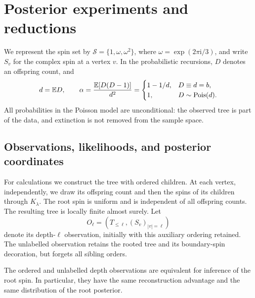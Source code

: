 \section{Posterior experiments and reductions}
\label{fnd:section}

We represent the spin set by
\(\mathcal S=\{1,\omega,\omega^2\}\), where
\(\omega=\exp(2\pi\mathrm{i}/3)\), and write \(S_v\) for the
complex spin at a vertex \(v\). In the probabilistic recursions,
\(D\) denotes an offspring count, and
\begin{equation}\label{fnd:offspring}
 d=\mathbb E D,\qquad
 \alpha=\frac{\mathbb E[D(D-1)]}{d^2}
 =\begin{cases}1-1/d,&D\equiv d=b,\\1,&D\sim\operatorname{Pois}(d).
 \end{cases}
\end{equation}
All probabilities in the Poisson model are unconditional: the observed
tree is part of the data, and extinction is not removed from the sample
space.

\subsection{Observations, likelihoods, and posterior coordinates}

For calculations we construct the tree with ordered children.  At each
vertex, independently, we draw its offspring count and then the spins of
its children through \(K_\lambda\).  The root spin is uniform and is
independent of all offspring counts.  The resulting tree is locally
finite almost surely.  Let
\[
 O_\ell=(T_{\leq\ell},(S_v)_{|v|=\ell})
\]
denote its depth-\(\ell\) observation, initially with this auxiliary
ordering retained.  The unlabelled observation retains the rooted tree
and its boundary-spin decoration, but forgets all sibling orders.

\begin{lemma}\label{fnd:ordered}
The ordered and unlabelled depth observations are equivalent for inference
of the root spin.  In particular, they have the same reconstruction
advantage and the same distribution of the root posterior.
\end{lemma}

